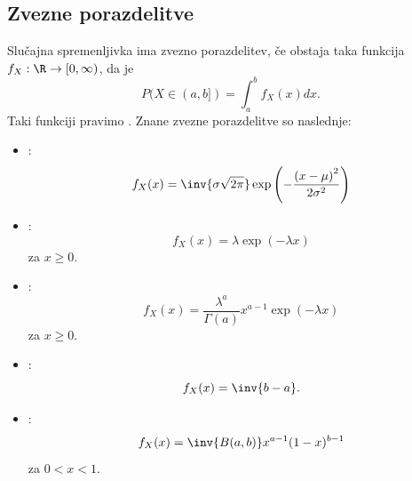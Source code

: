 \subsection{Zvezne porazdelitve}

Slučajna spremenljivka ima zvezno porazdelitev, če obstaja taka funkcija $f_X:\R
\to [0, \infty)$, da je
\[
  P(X \in (a, b])
  = \int_a^b f_X(x) dx.
\]
Taki funkciji pravimo .
Znane zvezne porazdelitve so naslednje:
\begin{itemize}
\item {}:
  \[
	f_X(x) = \inv{\sigma \sqrt{2 \pi}} \exp\left( - \frac{{(x - \mu)}^2}{2
		\sigma^2} \right)
  \]
\item {}:
  \[
	f_X(x) = \lambda \exp(-\lambda x)
  \]
  za $x \ge 0$.
\item {}:
  \[
	f_X(x) = \frac{\lambda^a}{\Gamma(a)} x^{a-1} \exp(-\lambda x)
  \]
  za $x \ge 0$.
\item {}:
  \[
	f_X(x) = \inv{b-a}.
  \]
\item {}:
  \[
	f_X(x) = \inv{B(a, b)} x^{a-1} (1-x)^{b-1}
  \]
  za $0 < x < 1$.
\end{itemize}
